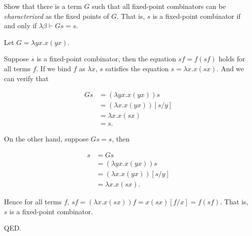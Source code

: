 \documentclass{homework}
\begin{document}
\begin{problem}
  Show that there is a term $G$ such that all fixed-point combinators can be
  \emph{characterized} as the fixed points of $G$.
  That is, $s$ is a fixed-point combinator if and only if
  $\lambda\beta \vdash G s = s$.
\end{problem}

\begin{solution}

  Let $G = \lambda yx.x(yx)$.

  Suppose $s$ is a fixed-point combinator,
  then the equation $sf = f(sf)$ holds for all terms $f$.
  If we bind $f$ as $\lambda x$, $s$ satisfies the equation $s = \lambda x.x(sx)$.
  And we can verify that

  \begin{align*}
    Gs & = (\lambda yx.x(yx))s \\
    & = (\lambda x.x(yx))[s/y] \\
    & = \lambda x.x(sx) \\
    & = s.
  \end{align*}

  On the other hand, suppose $G s = s$, then

  \begin{align*}
    s & = G s \\
    & = (\lambda yx.x(yx))s \\
    & = (\lambda x.x(yx))[s/y] \\
    & = \lambda x.x(sx).
  \end{align*}

  Hence for all terms $f$,
  $sf = (\lambda x.x(sx))f = x(sx)[f/x] = f(sf)$.
  That is, $s$ is a fixed-point combinator.

  QED.

\end{solution}
\end{document}
